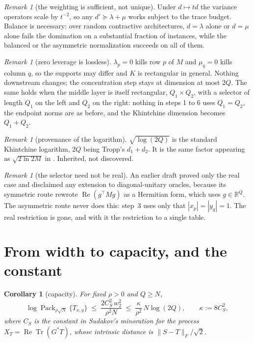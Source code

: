 \documentclass[11pt,a4paper]{article}
\theoremstyle{plain}
\newtheorem{corollary}[theorem]{Corollary}
\theoremstyle{definition}
\theoremstyle{remark}
\newtheorem{remark}[theorem]{Remark}
\DeclareMathOperator{\Tr}{Tr}
\DeclareMathOperator{\Pack}{Pack}
\newcommand{\R}{\mathbb R}
\newcommand{\Fro}[1]{\|#1\|_F}
\begin{document}
\begin{remark}[the weighting is sufficient, not unique]\label{rem:weighting}
Under $d\mapsto td$ the variance operators scale by $t^{-2}$, so any $d'\succeq\lambda+\mu$
works subject to the trace budget. Balance is necessary: over random contractive
architectures, $d=\lambda$ alone or $d=\mu$ alone fails the domination on a substantial
fraction of instances, while the balanced or the asymmetric normalization succeeds on all
of them.
\end{remark}

\begin{remark}[zero leverage is lossless]\label{rem:zero}
$\lambda_p=0$ kills row $p$ of $M$ and $\mu_q=0$ kills column $q$, so the supports may differ
and $K$ is rectangular in general. Nothing downstream changes; the concentration step stays
at dimension at most $2Q$. The same holds when the middle layer is itself rectangular,
$Q_1\times Q_2$, with a selector of length $Q_1$ on the left and $Q_2$ on the right: nothing in
steps 1 to 6 uses $Q_1=Q_2$, the endpoint norms are as before, and the Khintchine dimension
becomes $Q_1+Q_2$.
\end{remark}

\begin{remark}[provenance of the logarithm]\label{rem:log}
$\sqrt{\log(2Q)}$ is the standard Khintchine logarithm, $2Q$ being Tropp's $d_1+d_2$. It is
the same factor appearing as $\sqrt{2\ln2M}$ in \cite[Lem.~4.11]{LMW24}. Inherited, not
discovered.
\end{remark}

\begin{remark}[the selector need not be real]\label{rem:complex}
An earlier draft proved only the real case and disclaimed any extension to diagonal-unitary
oracles, because its symmetric route rewrote $\operatorname{Re}(g^{\top}Mg)$ as a Hermitian
form, which uses $g\in\R^Q$. The asymmetric route never does this: step~3 uses only that
$|x_p|=|y_q|=1$. The real restriction is gone, and with it the restriction to a single table.
\end{remark}

\section{From width to capacity, and the constant}\label{sec:capacity}

\begin{corollary}[capacity]\label{cor:capacity}
For fixed $\rho>0$ and $Q\ge N$,
\[
\log\Pack_{\rho\sqrt N}\{T_{x,y}\}\;\le\;\frac{2C_S^2\,w_2^2}{\rho^2N}\;\le\;\frac{\kappa}{\rho^2}\,N\log(2Q),
\qquad \kappa:=8C_S^2,
\]
where $C_S$ is the constant in Sudakov's minoration for the process
$X_T=\operatorname{Re}\Tr(G^{*}T)$, whose intrinsic distance is $\Fro{S-T}/\sqrt2$.
\end{corollary}
\end{document}
